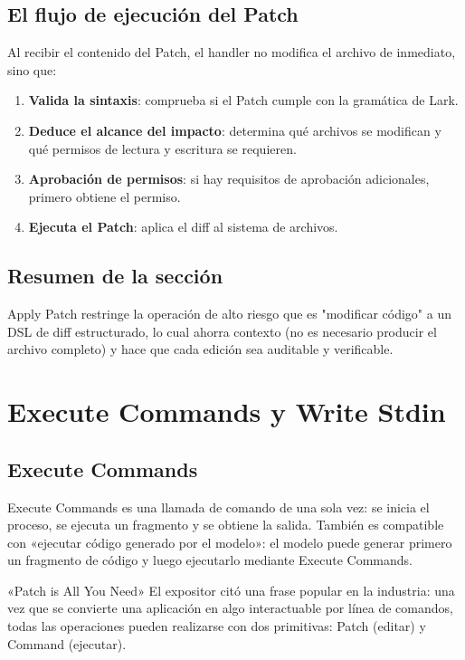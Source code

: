 \documentclass[a4paper]{article}
\begin{document}
\subsection{El flujo de ejecución del Patch}

Al recibir el contenido del Patch, el handler no modifica el archivo de inmediato, sino que:
\begin{enumerate}
    \item \textbf{Valida la sintaxis}: comprueba si el Patch cumple con la gramática de Lark.
    \item \textbf{Deduce el alcance del impacto}: determina qué archivos se modifican y qué permisos de lectura y escritura se requieren.
    \item \textbf{Aprobación de permisos}: si hay requisitos de aprobación adicionales, primero obtiene el permiso.
    \item \textbf{Ejecuta el Patch}: aplica el diff al sistema de archivos.
\end{enumerate}

\subsection{Resumen de la sección}

Apply Patch restringe la operación de alto riesgo que es "modificar código" a un DSL de diff estructurado, lo cual ahorra contexto (no es necesario producir el archivo completo) y hace que cada edición sea auditable y verificable.

\section{Execute Commands y Write Stdin}

\subsection{Execute Commands}

Execute Commands es una llamada de comando de una sola vez: se inicia el proceso, se ejecuta un fragmento y se obtiene la salida. También es compatible con «ejecutar código generado por el modelo»: el modelo puede generar primero un fragmento de código y luego ejecutarlo mediante Execute Commands.

\begin{knowledgebox}{«Patch is All You Need»}
El expositor citó una frase popular en la industria: una vez que se convierte una aplicación en algo interactuable por línea de comandos, todas las operaciones pueden realizarse con dos primitivas: Patch (editar) y Command (ejecutar).
\end{knowledgebox}
\end{document}
